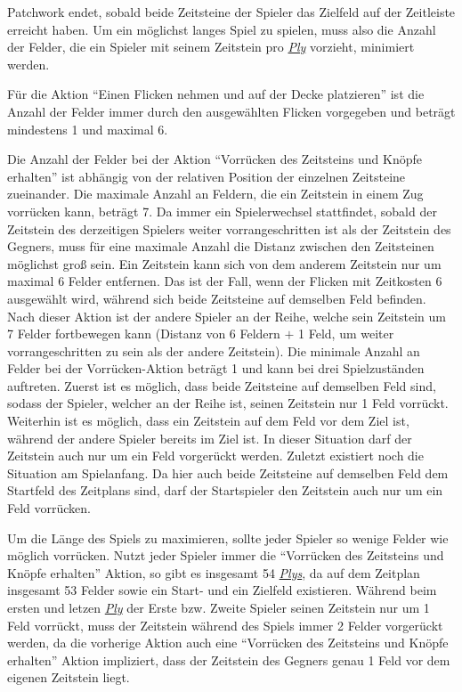 Patchwork endet, sobald beide Zeitsteine der Spieler das Zielfeld auf der Zeitleiste erreicht haben. Um ein möglichst langes Spiel zu spielen, muss also die Anzahl der Felder, die ein Spieler mit seinem Zeitstein pro \hyperref[text:ply]{\emph{Ply}} vorzieht, minimiert werden.

Für die Aktion \enquote{Einen Flicken nehmen und auf der Decke platzieren} ist die Anzahl der Felder immer durch den ausgewählten Flicken vorgegeben und beträgt mindestens 1 und maximal 6.

Die Anzahl der Felder bei der Aktion \enquote{Vorrücken des Zeitsteins und Knöpfe erhalten} ist abhängig von der relativen Position der einzelnen Zeitsteine zueinander. Die maximale Anzahl an Feldern, die ein Zeitstein in einem Zug vorrücken kann, beträgt 7. Da immer ein Spielerwechsel stattfindet, sobald der Zeitstein des derzeitigen Spielers weiter vorrangeschritten ist als der Zeitstein des Gegners, muss für eine maximale Anzahl die Distanz zwischen den Zeitsteinen möglichst groß sein. Ein Zeitstein kann sich von dem anderem Zeitstein nur um maximal 6 Felder entfernen. Das ist der Fall, wenn der Flicken mit Zeitkosten 6 ausgewählt wird, während sich beide Zeitsteine auf demselben Feld befinden. Nach dieser Aktion ist der andere Spieler an der Reihe, welche sein Zeitstein um 7 Felder fortbewegen kann (Distanz von 6 Feldern $+$ 1 Feld, um weiter vorrangeschritten zu sein als der andere Zeitstein). Die minimale Anzahl an Felder bei der Vorrücken-Aktion beträgt 1 und kann bei drei Spielzuständen auftreten. Zuerst ist es möglich, dass beide Zeitsteine auf demselben Feld sind, sodass der Spieler, welcher an der Reihe ist, seinen Zeitstein nur 1 Feld vorrückt. Weiterhin ist es möglich, dass ein Zeitstein auf dem Feld vor dem Ziel ist, während der andere Spieler bereits im Ziel ist. In dieser Situation darf der Zeitstein auch nur um ein Feld vorgerückt werden. Zuletzt existiert noch die Situation am Spielanfang. Da hier auch beide Zeitsteine auf demselben Feld \textemdash{} dem Startfeld des Zeitplans \textemdash{} sind, darf der Startspieler den Zeitstein auch nur um ein Feld vorrücken.

Um die Länge des Spiels zu maximieren, sollte jeder Spieler so wenige Felder wie möglich vorrücken. Nutzt jeder Spieler immer die \enquote{Vorrücken des Zeitsteins und Knöpfe erhalten} Aktion, so gibt es insgesamt 54 \hyperref[text:ply]{\emph{Plys}}, da auf dem Zeitplan insgesamt 53 Felder sowie ein Start- und ein Zielfeld existieren. Während beim ersten und letzen \hyperref[text:ply]{\emph{Ply}} der Erste bzw. Zweite Spieler seinen Zeitstein nur um 1 Feld vorrückt, muss der Zeitstein während des Spiels immer 2 Felder vorgerückt werden, da die vorherige Aktion \textemdash{} auch eine \enquote{Vorrücken des Zeitsteins und Knöpfe erhalten} Aktion \textemdash{} impliziert, dass der Zeitstein des Gegners genau 1 Feld vor dem eigenen Zeitstein liegt.

